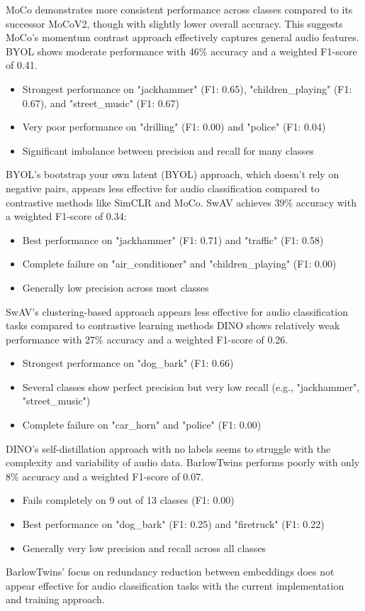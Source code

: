 \documentclass[11pt]{article}
\begin{document}
MoCo demonstrates more consistent performance across classes compared to its successor MoCoV2, though with slightly lower overall accuracy. This suggests MoCo's momentum contrast approach effectively captures general audio features.
BYOL shows moderate performance with 46\% accuracy and a weighted F1-score of 0.41.
\begin{itemize}
    \item Strongest performance on "jackhammer" (F1: 0.65), "children\_playing" (F1: 0.67), and "street\_music" (F1: 0.67)
    \item Very poor performance on "drilling" (F1: 0.00) and "police" (F1: 0.04)
    \item Significant imbalance between precision and recall for many classes
\end{itemize}
BYOL's bootstrap your own latent (BYOL) approach, which doesn't rely on negative pairs, appears less effective for audio classification compared to contrastive methods like SimCLR and MoCo.
SwAV achieves 39\% accuracy with a weighted F1-score of 0.34:
\begin{itemize}
    \item Best performance on "jackhammer" (F1: 0.71) and "traffic" (F1: 0.58)
    \item Complete failure on "air\_conditioner" and "children\_playing" (F1: 0.00)
    \item Generally low precision across most classes
\end{itemize}
SwAV's clustering-based approach appears less effective for audio classification tasks compared to contrastive learning methods
DINO shows relatively weak performance with 27\% accuracy and a weighted F1-score of 0.26.
\begin{itemize}
    \item Strongest performance on "dog\_bark" (F1: 0.66)
    \item Several classes show perfect precision but very low recall (e.g., "jackhammer", "street\_music")
    \item Complete failure on "car\_horn" and "police" (F1: 0.00)
\end{itemize}
DINO's self-distillation approach with no labels seems to struggle with the complexity and variability of audio data.
BarlowTwins performs poorly with only 8\% accuracy and a weighted F1-score of 0.07.
\begin{itemize}
    \item Fails completely on 9 out of 13 classes (F1: 0.00)
    \item Best performance on "dog\_bark" (F1: 0.25) and "firetruck" (F1: 0.22)
    \item Generally very low precision and recall across all classes
\end{itemize}
BarlowTwins' focus on redundancy reduction between embeddings does not appear effective for audio classification tasks with the current implementation and training approach.
\end{document}
